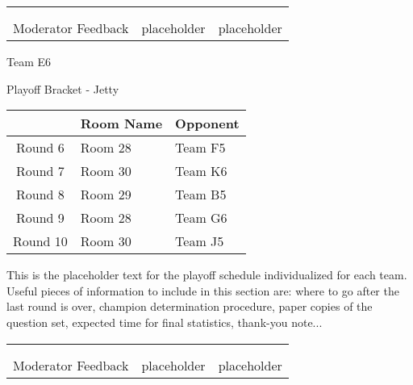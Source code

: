 \documentclass{article}%
\begin{document}
\newline%
%
\begin{tabularx}{\textwidth}{YYY}%
  &  &  \\%
\\%
Moderator Feedback&placeholder&placeholder\\%
\end{tabularx}%
\newpage%
\begin{center}%
\begin{Huge}%
Team E6%
\end{Huge}%
\vspace*{12pt}%
\linebreak%
\begin{Large}%
Playoff Bracket {-} Jetty%
\end{Large}%
\end{center}%
\vspace*{4pt}%
%
\begin{tabularx}{\textwidth}{|c|Y|Y|}%
\hline%
&Room Name&Opponent\\%
\hline%
Round 6&Room 28&Team F5\\%
Round 7&Room 30&Team K6\\%
Round 8&Room 29&Team B5\\%
Round 9&Room 28&Team G6\\%
Round 10&Room 30&Team J5\\%
\hline%
\end{tabularx}%
\vspace*{30pt}%
\linebreak%
This is the placeholder text for the playoff schedule individualized for each team. Useful pieces of information to include in this section are: where to go after the last round is over, champion determination procedure, paper copies of the question set, expected time for final statistics, thank{-}you note...%
\vspace*{30pt}%
\newline%
%
\begin{tabularx}{\textwidth}{YYY}%
  &  &  \\%
\\%
Moderator Feedback&placeholder&placeholder\\%
\end{tabularx}%
\end{document}
